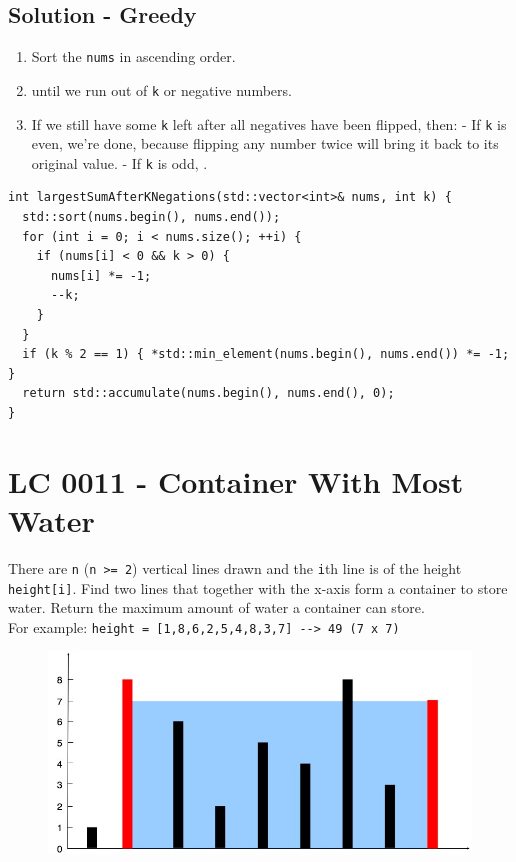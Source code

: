 \subsection*{Solution - Greedy}
\begin{enumerate}
\item Sort the {\colorbox{CodeBackground}{\lstinline|nums|}} in ascending order.
\item {\color{magenta}{Flip the negative numbers from the most negative to the least negative}} until we run out of {\colorbox{CodeBackground}{\lstinline|k|}} or negative numbers.
\item If we still have some {\colorbox{CodeBackground}{\lstinline|k|}} left after all negatives have been flipped, then:
  \subitem - If {\colorbox{CodeBackground}{\lstinline|k|}} is even, we're done, because flipping any number twice will bring it back to its original value.
  \subitem - If {\colorbox{CodeBackground}{\lstinline|k|}} is odd, {\color{magenta}{flip the smallest positive number}}.
\end{enumerate}
\begin{lstlisting}
int largestSumAfterKNegations(std::vector<int>& nums, int k) {
  std::sort(nums.begin(), nums.end());
  for (int i = 0; i < nums.size(); ++i) {
    if (nums[i] < 0 && k > 0) {
      nums[i] *= -1;
      --k;
    }
  }
  if (k % 2 == 1) { *std::min_element(nums.begin(), nums.end()) *= -1; }
  return std::accumulate(nums.begin(), nums.end(), 0);
}
\end{lstlisting}

\section{LC 0011 - Container With Most Water}\label{lc0011}
There are {\colorbox{CodeBackground}{\lstinline|n|}} ({\colorbox{CodeBackground}{\lstinline|n >= 2|}}) vertical lines drawn and the {\colorbox{CodeBackground}{\lstinline|i|}}th line is of the height {\colorbox{CodeBackground}{\lstinline|height[i]|}}. Find two lines that together with the x-axis form a container to store water. Return the maximum amount of water a container can store.\\

For example: {\colorbox{CodeBackground}{\lstinline|height = [1,8,6,2,5,4,8,3,7] --> 49 (7 x 7)|}}
\begin{figure}[H]
	\centering
	\includegraphics[width=0.5\linewidth]{images/lc0011_example}
	\label{fig:lc0011example}
\end{figure}

